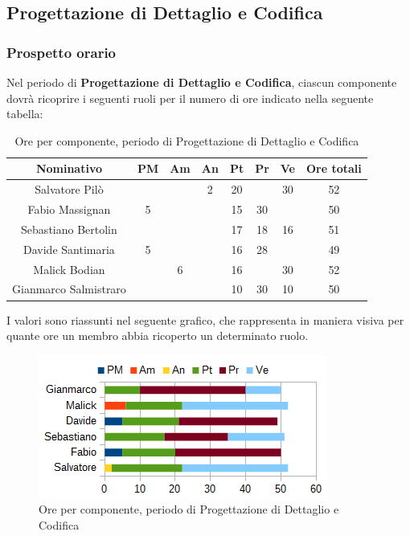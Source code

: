 	\subsection{Progettazione di Dettaglio e Codifica}
		\subsubsection{Prospetto orario}
		Nel periodo di \textbf{Progettazione di Dettaglio e Codifica}, ciascun componente dovrà ricoprire i seguenti ruoli per il numero di ore indicato nella seguente tabella: \\
		\begin{table}[H]
		\centering
		\begin{tabular}{|c|c|c|c|c|c|c|c|}
			\hline
			\textbf{Nominativo}		& \textbf{PM}	& \textbf{Am}	& \textbf{An}	& \textbf{Pt}	& \textbf{Pr}	& \textbf{Ve}	& \textbf{Ore totali}     \\
			\hline
			Salvatore Pilò			& 		& 		& 2		& 20	&		& 30	& 52 \\
			Fabio Massignan			& 5		& 		&		& 15	& 30	& 		& 50 \\
			Sebastiano Bertolin		&		& 		& 		& 17	& 18	& 16	& 51 \\
			Davide Santimaria		& 5		& 		& 		& 16	& 28	&		& 49 \\
			Malick Bodian			& 		& 6		&		& 16	&		& 30	& 52 \\
			Gianmarco Salmistraro	&		& 		& 		& 10	& 30	& 10	& 50 \\
			\hline
		\end{tabular}
		\caption{Ore per componente, periodo di Progettazione di Dettaglio e Codifica}
		\end{table}
		I valori sono riassunti nel seguente grafico, che rappresenta in maniera visiva per quante ore un membro abbia ricoperto un determinato ruolo. \\
		\begin{figure}[H]
			\centering
			\includegraphics[scale=1]{immagini/grafici/progettazione_dettaglio_codifica-barra.png}
			\caption{Ore per componente, periodo di Progettazione di Dettaglio e Codifica}
		\end{figure}
